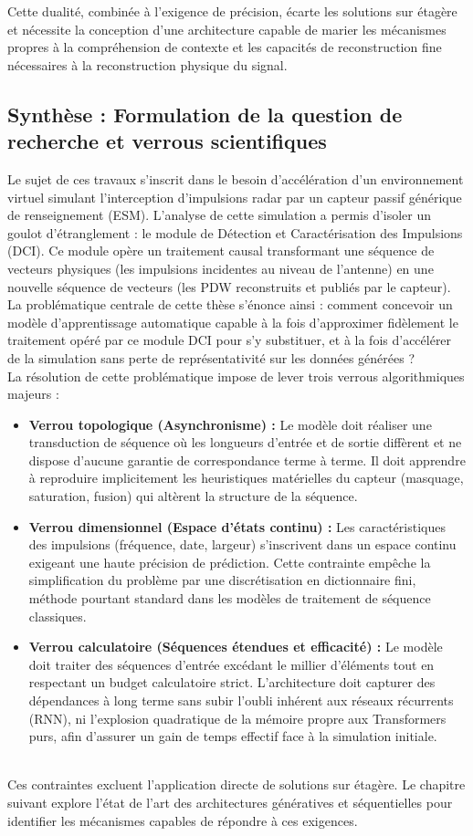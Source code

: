 Cette dualité, combinée à l'exigence de précision, écarte les solutions sur étagère et nécessite la conception d'une architecture capable de marier les mécanismes propres à la compréhension de contexte et les capacités de reconstruction fine nécessaires à la reconstruction physique du signal.

\subsection{Synthèse : Formulation de la question de recherche et verrous scientifiques}

Le sujet de ces travaux s'inscrit dans le besoin d'accélération d'un environnement virtuel simulant l'interception d'impulsions radar par un capteur passif générique de renseignement (ESM). L'analyse de cette simulation a permis d'isoler un goulot d'étranglement : le module de Détection et Caractérisation des Impulsions (DCI). Ce module opère un traitement causal transformant une séquence de vecteurs physiques (les impulsions incidentes au niveau de l'antenne) en une nouvelle séquence de vecteurs (les PDW reconstruits et publiés par le capteur).\\

La problématique centrale de cette thèse s'énonce ainsi : comment concevoir un modèle d'apprentissage automatique capable à la fois d'approximer fidèlement le traitement opéré par ce module DCI pour s'y substituer, et à la fois d'accélérer de la simulation sans perte de représentativité sur les données générées ?\\

La résolution de cette problématique impose de lever trois verrous algorithmiques majeurs :

\begin{itemize}
    \item \textbf{Verrou topologique (Asynchronisme) :} Le modèle doit réaliser une transduction de séquence où les longueurs d'entrée et de sortie diffèrent et ne dispose d'aucune garantie de correspondance terme à terme. Il doit apprendre à reproduire implicitement les heuristiques matérielles du capteur (masquage, saturation, fusion) qui altèrent la structure de la séquence.
    \item \textbf{Verrou dimensionnel (Espace d'états continu) :} Les caractéristiques des impulsions (fréquence, date, largeur) s'inscrivent dans un espace continu exigeant une haute précision de prédiction. Cette contrainte empêche la simplification du problème par une discrétisation en dictionnaire fini, méthode pourtant standard dans les modèles de traitement de séquence classiques.
    \item \textbf{Verrou calculatoire (Séquences étendues et efficacité) :} Le modèle doit traiter des séquences d'entrée excédant le millier d'éléments tout en respectant un budget calculatoire strict. L'architecture doit capturer des dépendances à long terme sans subir l'oubli inhérent aux réseaux récurrents (RNN), ni l'explosion quadratique de la mémoire propre aux Transformers purs, afin d'assurer un gain de temps effectif face à la simulation initiale.
\end{itemize}
\; \\

Ces contraintes excluent l'application directe de solutions sur étagère. Le chapitre suivant explore l'état de l'art des architectures génératives et séquentielles pour identifier les mécanismes capables de répondre à ces exigences.
